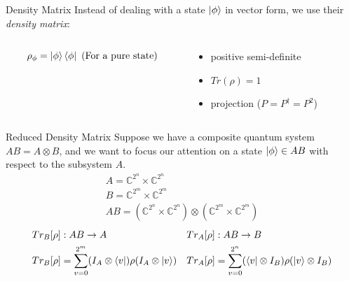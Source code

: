 \documentclass[11pt,svgnames,smaller,aspectratio=43,english]{beamer}
\newcommand{\tensor}{\otimes}
\begin{document}
\begin{frame}{Density Matrix}
	Instead of dealing with a state $\ket{\phi}$ in vector form, we use their \emph{density matrix}:

	\begin{columns}
		\begin{column}[T]{0.35\textwidth}
			\begin{equation*}
				\rho_\phi = \ket{\phi}\bra{\phi} \text{ (For a pure state)}		
			\end{equation*}
		\end{column}
		\begin{column}[T]{0.5\textwidth}
			\begin{itemize}
				\item positive semi-definite
				\item $Tr(\rho) = 1$
				\item projection ($P = P^\dagger = P^2$)
			\end{itemize}
		\end{column}
	\end{columns}

	\vspace*{1em}

	
\end{frame}

\begin{frame}{Reduced Density Matrix}
	Suppose we have a composite quantum system $AB = A \tensor B$, and we want to focus our attention on a state $\ket{\phi} \in AB$ with respect to the subsystem $A$.
	\begin{gather*}
		A = \mathbb{C}^{2^n}\times\mathbb{C}^{2^n}\\
		B = \mathbb{C}^{2^m}\times\mathbb{C}^{2^m}\\
		AB = (\mathbb{C}^{2^n}\times\mathbb{C}^{2^n})\tensor(\mathbb{C}^{2^m}\times\mathbb{C}^{2^m})
	\end{gather*}
	\begin{align*}
		Tr_B[\rho] &: AB \rightarrow A && Tr_A[\rho] : AB \rightarrow B\\
		Tr_B[\rho] &= \sum_{v=0}^{2^m} (I_A \tensor \bra{v})\rho(I_A \tensor \ket{v}) && Tr_A[\rho] = \sum_{v=0}^{2^n} (\bra{v} \tensor I_B)\rho(\ket{v} \tensor I_B)
	\end{align*}
\end{frame}
\end{document}
